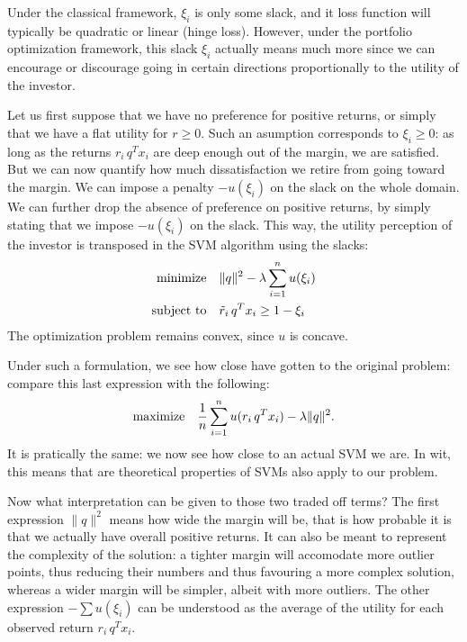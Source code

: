 \documentclass{article}
\begin{document}
Under the classical framework, $\xi_i$ is only some slack, and it loss function will
typically be quadratic or linear (hinge loss). However, under the portfolio optimization
framework, this slack $\xi_i$ actually means much more since we can encourage or
discourage going in certain directions proportionally to the utility of the investor.

Let us first suppose that we have no preference for positive returns, or simply that we
have a flat utility for $r\geq 0$. Such an asumption corresponds to $\xi_i\geq 0$: as long
as the returns $r_i\,q^Tx_i$ are deep enough out of the margin, we are satisfied. But we
can now quantify how much dissatisfaction we retire from going toward the margin. We can
impose a penalty $-u(\xi_i)$ on the slack on the whole domain. We can further drop the
absence of preference on positive returns, by simply stating that we impose $-u(\xi_i)$ on
the slack. This way, the utility perception of the investor is transposed in the SVM
algorithm using the slacks:
\begin{align*}
  \minimizeEquationSt{\|q\|^2-\lambda\sum_{i=1}^nu(\xi_i)}{\tilde r_i\,q^Tx_i\geq 1 - \xi_i}
\end{align*}
The optimization problem remains convex, since $u$ is concave.

Under such a formulation, we see how close have gotten to the original problem: compare
this last expression with the following:
\begin{align*}
  \text{maximize} \quad {\frac{1}{n}\sum_{i=1}^nu(r_i\,q^Tx_i) - \lambda\|q\|^2}.
\end{align*}
It is pratically the same: we now see how close to an actual SVM we are. In wit, this
means that are theoretical properties of SVMs also apply to our problem. 

Now what interpretation can be given to those two traded off terms? The first expression
$\|q\|^2$ means how wide the margin will be, that is how probable it is that we actually
have overall positive returns. It can also be meant to represent the complexity of the
solution: a tighter margin will accomodate more outlier points, thus reducing their
numbers and thus favouring a more complex solution, whereas a wider margin will be
simpler, albeit with more outliers. The other expression $-\sum u(\xi_i)$ can be
understood as the average of the utility for each observed return $r_i\,q^Tx_i$.
\end{document}
